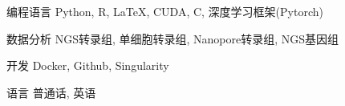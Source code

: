 

\begin{cvskills}




\cvskill
  {编程语言} %
  {Python, R, LaTeX, CUDA, C, 深度学习框架(Pytorch)} %

\cvskill
  {数据分析} %
  {NGS转录组, 单细胞转录组, Nanopore转录组, NGS基因组} %

\cvskill
  {开发} %
  {Docker, Github, Singularity} %

\cvskill
  {语言} %
  {普通话, 英语} %

\end{cvskills}
